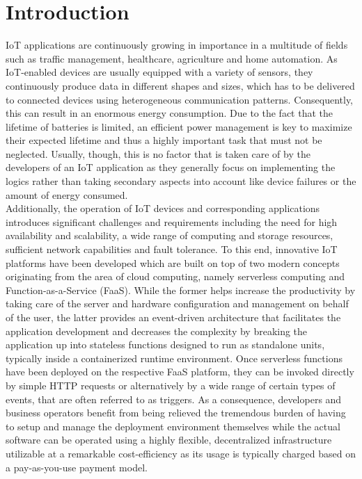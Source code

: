 
\chapter{Introduction}\label{chapter:introduction}
IoT applications are continuously growing in importance in a multitude of fields such as traffic management, healthcare, agriculture and home automation. As IoT-enabled devices are usually equipped with a variety of sensors, they continuously produce data in different shapes and sizes, which has to be delivered to connected devices using heterogeneous communication patterns. Consequently, this can result in an enormous energy consumption. Due to the fact that the lifetime of batteries is limited, an efficient power management is key to maximize their expected lifetime and thus a highly important task that must not be neglected. Usually, though, this is no factor that is taken care of by the developers of an IoT application as they generally focus on implementing the logics rather than taking secondary aspects into account like device failures or the amount of energy consumed.\\  
Additionally, the operation of IoT devices and corresponding applications introduces significant challenges and requirements including the need for high availability and scalability, a wide range of computing and storage resources, sufficient network capabilities and fault tolerance. To this end, innovative IoT platforms have been developed which are built on top of two modern concepts originating from the area of cloud computing, namely serverless computing and Function-as-a-Service (FaaS). While the former helps increase the productivity by taking care of the server and hardware configuration and management on behalf of the user, the latter provides an event-driven architecture that facilitates the application development and decreases the complexity by breaking the application up into stateless functions designed to run as standalone units, typically inside a containerized runtime environment. Once serverless functions have been deployed on the respective FaaS platform, they can be invoked directly by simple HTTP requests or alternatively by a wide range of certain types of events, that are often referred to as triggers. As a consequence, developers and business operators benefit from being relieved the tremendous burden of having to setup and manage the deployment environment themselves while the actual software can be operated using a highly flexible, decentralized infrastructure utilizable at a remarkable cost-efficiency as its usage is typically charged based on a pay-as-you-use payment model.\\
